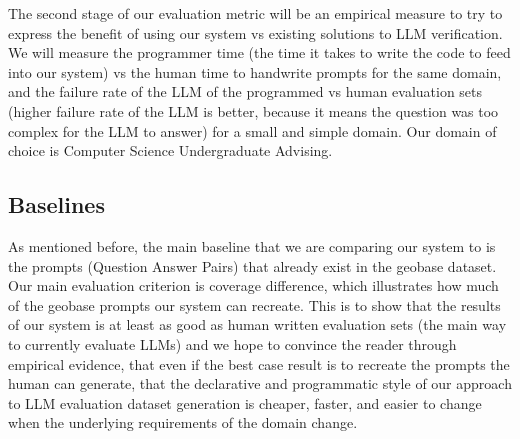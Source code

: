 \documentclass{article}
\begin{document}
The second stage of our evaluation metric will be an empirical measure to try to express the benefit of using our system vs existing solutions to LLM verification. We will measure the programmer time (the time it takes to write the code to feed into our system) vs the human time to handwrite prompts for the same domain, and the failure rate of the LLM of the programmed vs human evaluation sets (higher failure rate of the LLM is better, because it means the question was too complex for the LLM to answer) for a small and simple domain. Our domain of choice is Computer Science Undergraduate Advising.


\subsection{Baselines}
As mentioned before, the main baseline that we are comparing our system to is the prompts (Question Answer Pairs) that already exist in the geobase dataset. Our main evaluation criterion is coverage difference, which illustrates how much of the geobase prompts our system can recreate. This is to show that the results of our system is at least as good as human written evaluation sets (the main way to currently evaluate LLMs) and we hope to convince the reader through empirical evidence, that even if the best case result is to recreate the prompts the human can generate, that the declarative and programmatic style of our approach to LLM evaluation dataset generation is cheaper, faster, and easier to change when the underlying requirements of the domain change. 





\end{document}
